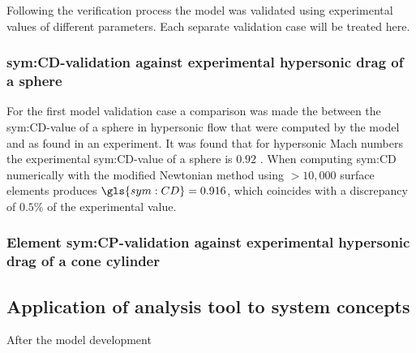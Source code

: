Following the verification process the model was validated using experimental values of different parameters. Each separate validation case will be treated here.

\subsubsection{\gls{sym:CD}-validation against experimental hypersonic drag of a sphere}
For the first model validation case a comparison was made the between the \gls{sym:CD}-value of a sphere in hypersonic flow that were computed by the model and as found in an experiment. It was found that for hypersonic Mach numbers the experimental \gls{sym:CD}-value of a sphere is $0.92$ \cite{Bailey1966,AndersonJr.2007,Cox1965}. When computing \gls{sym:CD} numerically with the modified Newtonian method using $>10,000$ surface elements produces $\gls{sym:CD}=0.916$, which coincides with a discrepancy of $0.5\%$ of the experimental value.

\subsubsection{Element \gls{sym:CP}-validation against experimental hypersonic drag of a cone cylinder}



\subsection{Application of analysis tool to system concepts}
\label{subsec:appaeroanal}
After the model development 